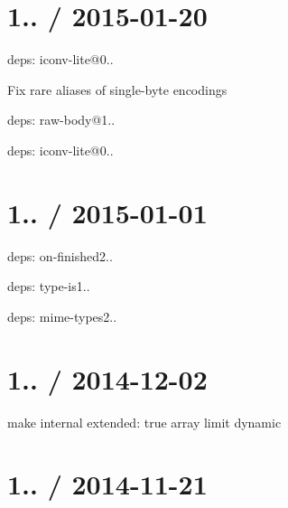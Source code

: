 \section*{1.. / 2015-\/01-\/20 }


\begin{DoxyItemize}
\item deps\+: iconv-\/lite@0..
\begin{DoxyItemize}
\item Fix rare aliases of single-\/byte encodings
\end{DoxyItemize}
\item deps\+: raw-\/body@1..
\begin{DoxyItemize}
\item deps\+: iconv-\/lite@0..
\end{DoxyItemize}
\end{DoxyItemize}

\section*{1.. / 2015-\/01-\/01 }


\begin{DoxyItemize}
\item deps\+: on-\/finished2..
\item deps\+: type-\/is1..
\begin{DoxyItemize}
\item deps\+: mime-\/types2..
\end{DoxyItemize}
\end{DoxyItemize}

\section*{1.. / 2014-\/12-\/02 }


\begin{DoxyItemize}
\item make internal {\ttfamily extended\+: true} array limit dynamic
\end{DoxyItemize}

\section*{1.. / 2014-\/11-\/21 }



